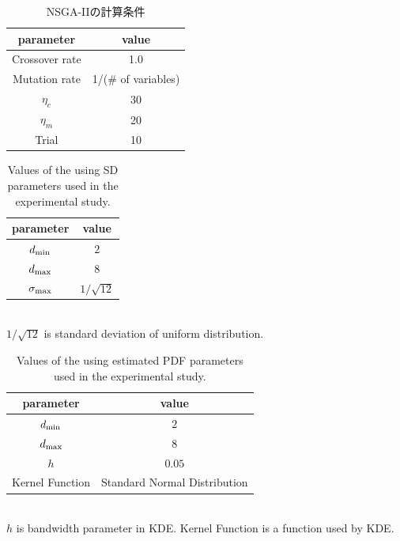 \documentclass[../main/main]{subfiles}
\begin{document}
\begin{table}[htbp]
\begin{center}
\caption{NSGA-IIの計算条件}
\label{tbl:condition}
\begin{tabular}{c|c}
\hline 
parameter & value \\
\hline 
Crossover rate & 1.0\\
Mutation rate & 1/(\# of variables)\\
$\eta_c$ & 30 \\
$\eta_m$ & 20 \\
Trial & 10\\
\end{tabular}
\end{center}
\end{table}

\begin{table}[htbp]
\centering
\caption{Values of the using SD parameters used in the experimental study.}
\label{tbl:sd_condition}
\begin{tabular}{c|c}
\hline 
parameter & value \\
\hline 
$d_{\rm min}$ & $2$\\
$d_{\rm max}$ & $8$\\
$\sigma_{\rm max}$ & $1 / \sqrt{12}$ \\
\hline
\end{tabular}
\\
{\footnotesize $1 / \sqrt{12}$ is standard deviation of uniform distribution.}
\end{table}

\begin{table}[htbp]
\centering
\caption{Values of the using estimated PDF parameters used in the experimental study.}
\label{tbl:pdf_condition}
\begin{tabular}{c|c}
\hline 
parameter & value \\
\hline 
$d_{\rm min}$ & $2$\\
$d_{\rm max}$ & $8$\\
$h$ & $0.05$ \\
Kernel Function & Standard Normal Distribution\\
\hline
\end{tabular}
\\
{\footnotesize $h$ is bandwidth parameter in KDE.}
{\footnotesize Kernel Function is a function used by KDE.}
\end{table}
\end{document}
